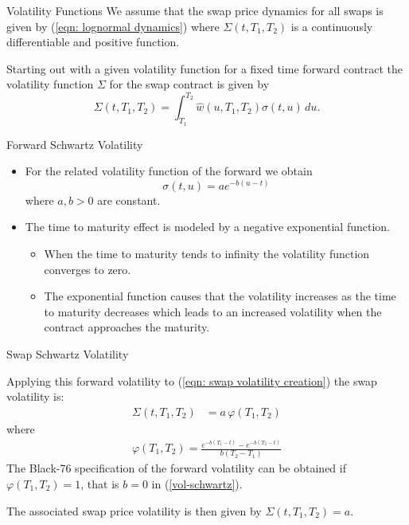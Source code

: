 {Volatility Functions}
We assume that the swap price dynamics for all swaps is given by (\ref{eqn: lognormal dynamics})
where $\Sigma(t,T_1,T_2)$ is a continuously differentiable and positive function.

Starting out with a given volatility function for a fixed time forward contract the volatility function $\Sigma$ for the swap contract is given by
\begin{equation}
\Sigma(t,T_1,T_2)=\int_{T_1}^{T_2} \hat{w}(u,T_1,T_2) \sigma(t,u) \, du. \label{eqn: swap volatility creation}
\end{equation}



{Forward Schwartz Volatility}
\begin{itemize}
\item<1-> For the related volatility function of the forward we obtain
\begin{equation}\label{vol-schwartz}
\sigma(t,u)=a e^{-b(u-t)}
\end{equation}
where $a,b >0 $ are constant.
\item<2->
The time to maturity effect is modeled by a negative exponential function.
\begin{itemize}
\item When the time to maturity tends to infinity the volatility function converges to zero.
\item The exponential function causes that the volatility increases as the time to maturity decreases which leads to an increased volatility when the contract approaches the maturity.
\end{itemize}
\end{itemize}




{Swap Schwartz Volatility}

Applying this forward volatility to (\ref{eqn: swap volatility creation}) the swap volatility is:
\begin{align}
\Sigma(t,T_1,T_2)&=a\,\varphi(T_1,T_2)
\end{align}
where
\begin{align}
\varphi(T_1,T_2)= \frac{e^{-b(T_1-t)}-e^{-b(T_2-t)}}{b(T_2-T_1)}
\label{volatility function varphi}
\end{align}
The Black-76 specification of the forward volatility can be obtained if $\varphi(T_1,T_2) =1$, that is $b=0$
in (\ref{vol-schwartz}).

The associated swap price volatility is then given by $\Sigma(t,T_1,T_2)=a$.




